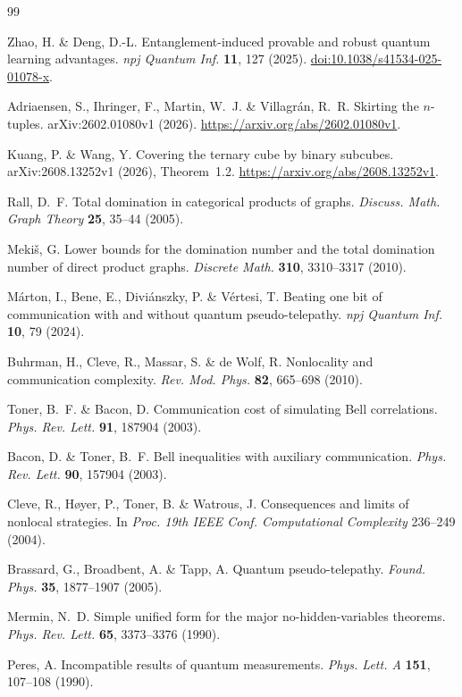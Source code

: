 \documentclass[12pt,a4paper]{article}
\theoremstyle{definition}
\theoremstyle{remark}
\begin{document}
\begin{thebibliography}{99}

Zhao, H. \& Deng, D.-L. Entanglement-induced provable and robust quantum learning advantages. \emph{npj Quantum Inf.} \textbf{11}, 127 (2025). \href{https://doi.org/10.1038/s41534-025-01078-x}{doi:10.1038/s41534-025-01078-x}.

Adriaensen, S., Ihringer, F., Martin, W.~J. \& Villagr\'an, R.~R. Skirting the $n$-tuples. arXiv:2602.01080v1 (2026). \url{https://arxiv.org/abs/2602.01080v1}.

Kuang, P. \& Wang, Y. Covering the ternary cube by binary subcubes. arXiv:2608.13252v1 (2026), Theorem~1.2. \url{https://arxiv.org/abs/2608.13252v1}.

Rall, D.~F. Total domination in categorical products of graphs. \emph{Discuss. Math. Graph Theory} \textbf{25}, 35--44 (2005).

Meki\v{s}, G. Lower bounds for the domination number and the total domination number of direct product graphs. \emph{Discrete Math.} \textbf{310}, 3310--3317 (2010).

M\'arton, I., Bene, E., Divi\'anszky, P. \& V\'ertesi, T. Beating one bit of communication with and without quantum pseudo-telepathy. \emph{npj Quantum Inf.} \textbf{10}, 79 (2024).

Buhrman, H., Cleve, R., Massar, S. \& de Wolf, R. Nonlocality and communication complexity. \emph{Rev. Mod. Phys.} \textbf{82}, 665--698 (2010).

Toner, B.~F. \& Bacon, D. Communication cost of simulating Bell correlations. \emph{Phys. Rev. Lett.} \textbf{91}, 187904 (2003).

Bacon, D. \& Toner, B.~F. Bell inequalities with auxiliary communication. \emph{Phys. Rev. Lett.} \textbf{90}, 157904 (2003).

Cleve, R., H{\o}yer, P., Toner, B. \& Watrous, J. Consequences and limits of nonlocal strategies. In \emph{Proc. 19th IEEE Conf. Computational Complexity} 236--249 (2004).

Brassard, G., Broadbent, A. \& Tapp, A. Quantum pseudo-telepathy. \emph{Found. Phys.} \textbf{35}, 1877--1907 (2005).

Mermin, N.~D. Simple unified form for the major no-hidden-variables theorems. \emph{Phys. Rev. Lett.} \textbf{65}, 3373--3376 (1990).

Peres, A. Incompatible results of quantum measurements. \emph{Phys. Lett. A} \textbf{151}, 107--108 (1990).

\end{thebibliography}
\end{document}
